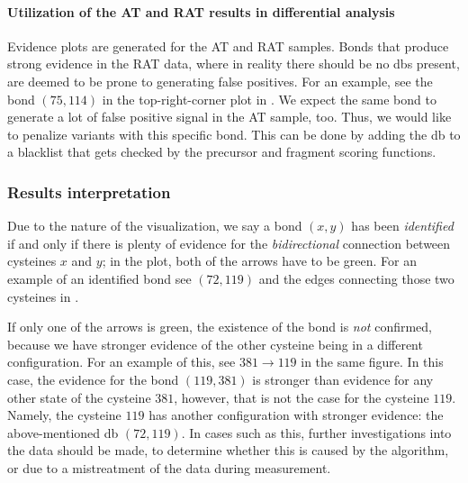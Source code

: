 \paragraph{Utilization of the AT and RAT results in differential analysis} Evidence plots are generated for the AT and RAT samples. Bonds that produce strong evidence in the RAT data, where in reality there should be no \glspl*{db} present, are deemed to be prone to generating false positives. For an example, see the bond \((75, 114)\) in the top-right-corner plot in . We expect the same bond to generate a lot of false positive signal in the AT sample, too. Thus, we would like to penalize variants with this specific bond. This can be done by adding the \gls*{db} to a blacklist that gets checked by the precursor and fragment scoring functions.

\subsubsection{Results interpretation}

Due to the nature of the visualization, we say a bond \((x, y)\) has been \emph{identified} if and only if there is plenty of evidence for the \emph{bidirectional} connection between cysteines \(x\) and \(y\); in the plot, both of the arrows have to be green. For an example of an identified bond see \((72, 119)\) and the edges connecting those two cysteines in .

If only one of the arrows is green, the existence of the bond is \emph{not} confirmed, because we have stronger evidence of the other cysteine being in a different configuration. For an example of this, see \(381 \to 119\) in the same figure. In this case, the evidence for the bond \((119, 381)\) is stronger than evidence for any other state of the cysteine \(381\), however, that is not the case for the cysteine \(119\). Namely, the cysteine \(119\) has another configuration with stronger evidence: the above-mentioned \gls*{db} \((72, 119)\). In cases such as this, further investigations into the data should be made, to determine whether this is caused by the algorithm, or due to a mistreatment of the data during measurement.